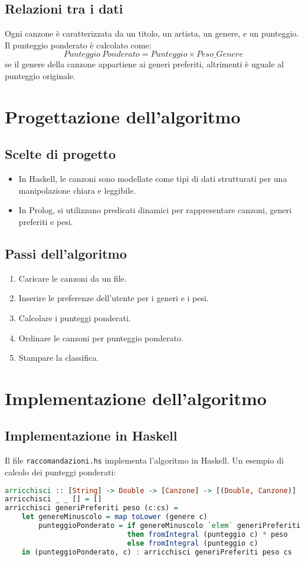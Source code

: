 \documentclass[a4paper,11pt]{article}
\begin{document}
\subsection{Relazioni tra i dati}
Ogni canzone è caratterizzata da un titolo, un artista, un genere, e un punteggio. Il punteggio ponderato è calcolato come:
\[
Punteggio\ Ponderato = Punteggio \times Peso\_{Genere}
\]
se il genere della canzone appartiene ai generi preferiti, altrimenti è uguale al punteggio originale.

\section{Progettazione dell'algoritmo}
\subsection{Scelte di progetto}
\begin{itemize}
    \item In Haskell, le canzoni sono modellate come tipi di dati strutturati per una manipolazione chiara e leggibile.
    \item In Prolog, si utilizzano predicati dinamici per rappresentare canzoni, generi preferiti e pesi.
\end{itemize}

\subsection{Passi dell'algoritmo}
\begin{enumerate}
    \item Caricare le canzoni da un file.
    \item Inserire le preferenze dell'utente per i generi e i pesi.
    \item Calcolare i punteggi ponderati.
    \item Ordinare le canzoni per punteggio ponderato.
    \item Stampare la classifica.
\end{enumerate}

\section{Implementazione dell'algoritmo}
\subsection{Implementazione in Haskell}
Il file \texttt{raccomandazioni.hs} implementa l'algoritmo in Haskell. Un esempio di calcolo dei punteggi ponderati:
\begin{lstlisting}[language=Haskell,caption=Calcolo dei punteggi ponderati]
arricchisci :: [String] -> Double -> [Canzone] -> [(Double, Canzone)]
arricchisci _ _ [] = []
arricchisci generiPreferiti peso (c:cs) =
    let genereMinuscolo = map toLower (genere c)
        punteggioPonderato = if genereMinuscolo `elem` generiPreferiti
                             then fromIntegral (punteggio c) * peso
                             else fromIntegral (punteggio c)
    in (punteggioPonderato, c) : arricchisci generiPreferiti peso cs
\end{lstlisting}
\end{document}
